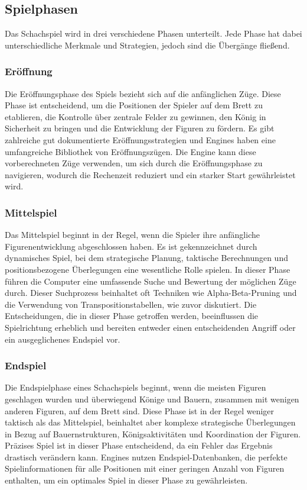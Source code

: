 \subsection{Spielphasen}
Das Schachspiel wird in drei verschiedene Phasen unterteilt. Jede Phase hat dabei unterschiedliche Merkmale und Strategien, jedoch sind die Übergänge fließend.

\subsubsection{Eröffnung}
Die Eröffnungsphase des Spiels bezieht sich auf die anfänglichen Züge. Diese Phase ist entscheidend, um die Positionen der Spieler auf dem Brett zu etablieren, 
die Kontrolle über zentrale Felder zu gewinnen, den König in Sicherheit zu bringen und die Entwicklung der Figuren zu fördern. 
Es gibt zahlreiche gut dokumentierte Eröffnungsstrategien und Engines haben eine umfangreiche Bibliothek von Eröffnungszügen. 
Die Engine kann diese vorberechneten Züge verwenden, um sich durch die Eröffnungsphase zu navigieren, wodurch die Rechenzeit reduziert 
und ein starker Start gewährleistet wird.

\subsubsection{Mittelspiel}
Das Mittelspiel beginnt in der Regel, wenn die Spieler ihre anfängliche Figurenentwicklung abgeschlossen haben. 
Es ist gekennzeichnet durch dynamisches Spiel, bei dem strategische Planung, taktische Berechnungen und positionsbezogene Überlegungen eine wesentliche Rolle spielen. 
In dieser Phase führen die Computer eine umfassende Suche und Bewertung der möglichen Züge durch. 
Dieser Suchprozess beinhaltet oft Techniken wie Alpha-Beta-Pruning und die Verwendung von Transpositionstabellen, wie zuvor diskutiert. 
Die Entscheidungen, die in dieser Phase getroffen werden, beeinflussen die Spielrichtung erheblich und bereiten entweder einen entscheidenden Angriff 
oder ein ausgeglichenes Endspiel vor.

\subsubsection{Endspiel}
Die Endspielphase eines Schachspiels beginnt, wenn die meisten Figuren geschlagen wurden und überwiegend Könige und Bauern, zusammen mit wenigen anderen Figuren, 
auf dem Brett sind. Diese Phase ist in der Regel weniger taktisch als das Mittelspiel, beinhaltet aber komplexe strategische Überlegungen 
in Bezug auf Bauernstrukturen, Königsaktivitäten und Koordination der Figuren. 
Präzises Spiel ist in dieser Phase entscheidend, da ein Fehler das Ergebnis drastisch verändern kann. 
Engines nutzen Endspiel-Datenbanken, die perfekte Spielinformationen für alle Positionen mit einer geringen Anzahl von Figuren enthalten, 
um ein optimales Spiel in dieser Phase zu gewährleisten.

